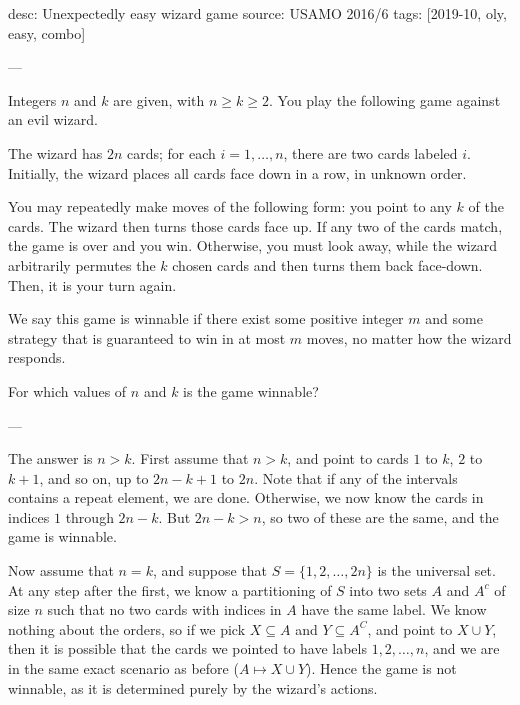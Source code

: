 desc: Unexpectedly easy wizard game
source: USAMO 2016/6
tags: [2019-10, oly, easy, combo]

---

Integers $n$ and $k$ are given, with $n\ge k\ge2$. You play the following game against an evil wizard.

The wizard has $2n$ cards; for each $i=1,\ldots,n$, there are two cards labeled $i$. Initially, the wizard places all cards face down in a row, in unknown order.

You may repeatedly make moves of the following form: you point to any $k$ of the cards. The wizard then turns those cards face up. If any two of the cards match, the game is over and you win. Otherwise, you must look away, while the wizard arbitrarily permutes the $k$ chosen cards and then turns them back face-down. Then, it is your turn again.

We say this game is winnable if there exist some positive integer $m$ and some strategy that is guaranteed to win in at most $m$ moves, no matter how the wizard responds.

For which values of $n$ and $k$ is the game winnable?

---

The answer is $n>k$. First assume that $n>k$, and point to cards $1$ to $k$, $2$ to $k+1$, and so on, up to $2n-k+1$ to $2n$. Note that if any of the intervals contains a repeat element, we are done. Otherwise, we now know the cards in indices $1$ through $2n-k$. But $2n-k>n$, so two of these are the same, and the game is winnable.

Now assume that $n=k$, and suppose that $S=\{1,2,\ldots,2n\}$ is the universal set. At any step after the first, we know a partitioning of $S$ into two sets $A$ and $A^c$ of size $n$ such that no two cards with indices in $A$ have the same label. We know nothing about the orders, so if we pick $X\subseteq A$ and $Y\subseteq A^C$, and point to $X\cup Y$, then it is possible that the cards we pointed to have labels $1,2,\ldots,n$, and we are in the same exact scenario as before ($A\mapsto X\cup Y$). Hence the game is not winnable, as it is determined purely by the wizard's actions.
